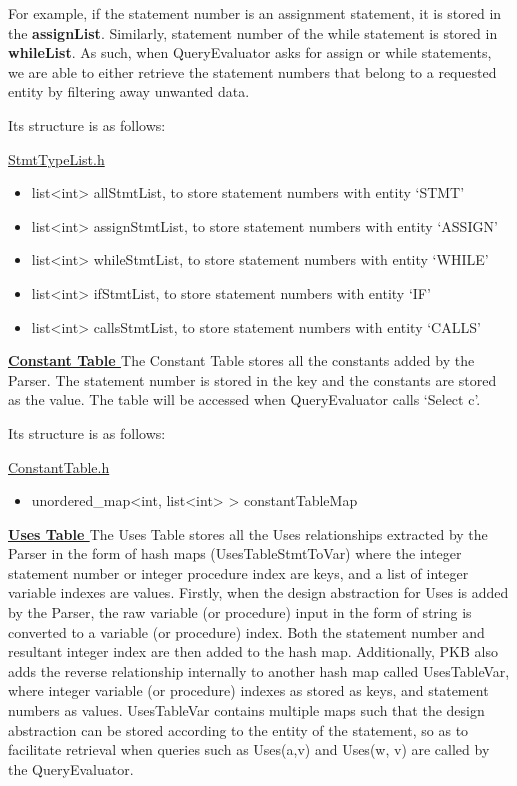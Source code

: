 \documentclass[12pt]{article}
\begin{document}
For example, if the statement number is an assignment statement, it is stored in the \textbf{assignList}. Similarly, statement number of the while statement is stored in \textbf{whileList}.  As such, when QueryEvaluator asks for assign or while statements, we are able to either retrieve the statement numbers that belong to a requested entity by filtering away unwanted data.

Its structure is as follows:

\underline{StmtTypeList.h}
\begin{itemize}
\item list<int> allStmtList, to store statement numbers with entity ‘STMT’
\item list<int> assignStmtList, to store statement numbers with entity ‘ASSIGN’
\item list<int> whileStmtList, to store statement numbers with entity ‘WHILE’
\item list<int> ifStmtList, to store statement numbers with entity ‘IF’
\item list<int> callsStmtList, to store statement numbers with entity ‘CALLS’
\end{itemize}
\vspace{6mm}
\textbf{\underline{Constant Table
}}\newline
The Constant Table stores all the constants added by the Parser. The statement number is stored in the key and the constants are stored as the value. The table will be accessed when QueryEvaluator calls ‘Select c’. 

Its structure is as follows:

\underline{ConstantTable.h}
\begin{itemize}
\item unordered\_map<int,   list<int> > constantTableMap
\end{itemize}
\vspace{6mm}
\textbf{\underline{Uses Table
}}
\newline The Uses Table stores all the Uses relationships extracted by the Parser in the form of hash maps (UsesTableStmtToVar) where the integer statement number or integer procedure index are keys, and a list of integer variable indexes are values. Firstly, when the design abstraction for Uses is added by the Parser, the raw variable (or procedure) input in the form of string is converted to a variable (or procedure) index. Both the statement number and resultant integer index are then added to the hash map. Additionally, PKB also adds the reverse relationship internally to another hash map called UsesTableVar, where integer variable (or procedure) indexes as stored as keys, and statement numbers as values. UsesTableVar contains multiple maps such that the design abstraction can be stored according to the entity of the statement, so as to facilitate retrieval when queries such as Uses(a,v) and Uses(w, v) are called by the QueryEvaluator.
\end{document}
